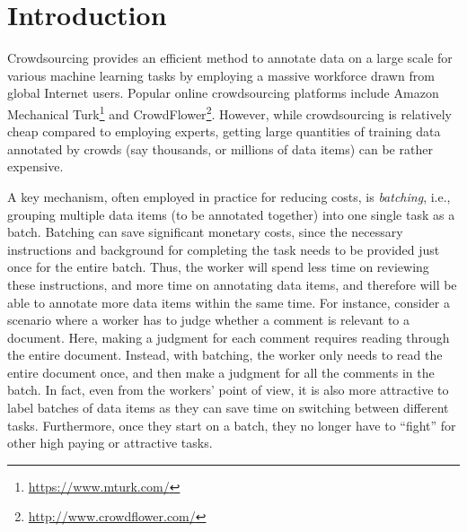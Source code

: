 

\section{Introduction}
\label{sec:intro}

Crowdsourcing provides an efficient method 
to annotate data on a large scale for various machine learning tasks
by employing a massive workforce drawn from global Internet users.
Popular online crowdsourcing platforms include
Amazon Mechanical Turk\footnote{\url{https://www.mturk.com/}} and CrowdFlower\footnote{\url{http://www.crowdflower.com/}}.
However, while crowdsourcing is relatively cheap compared
to employing experts, getting large quantities of training data
annotated by crowds (say thousands, or millions of data items) 
can be rather expensive. 

A key mechanism, often employed in practice for reducing costs, is {\em batching},
i.e., grouping multiple data items (to be annotated together) into one single
task as a batch. 
Batching can save significant monetary costs, since the necessary instructions
and background for completing the task needs to be provided just once
for the entire batch. 
Thus, the worker will spend less time on reviewing these instructions, 
and more time on annotating data items, and therefore will be able to
annotate more data items within the same time. 
For instance, consider a scenario where a worker has to judge whether
a comment is relevant to a document. 
Here, making a judgment for each comment requires reading through the entire 
document.
Instead, with batching, the worker only needs to read the entire document
once, and then make a judgment for all the comments in the batch. 
In fact, even from the workers' point of view,
it is also more attractive to label batches of data items
as they can save time on switching between different tasks.
Furthermore, once they start on a batch,
they no longer have to ``fight'' for other high paying or attractive tasks.

